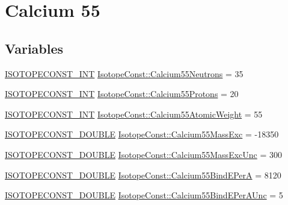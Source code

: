 \hypertarget{group___isotope_const-_calcium-_ca55}{}\section{Calcium 55}
\label{group___isotope_const-_calcium-_ca55}
\subsection*{Variables}
\begin{DoxyCompactItemize}
\item 
\mbox{\hyperlink{group___isotope_const-_macros_ga5f18360b3e99483a35c32d789e62621c}{I\+S\+O\+T\+O\+P\+E\+C\+O\+N\+S\+T\+\_\+\+I\+NT}} \mbox{\hyperlink{group___isotope_const-_calcium-_ca55_ga8b79490a883d8cbecca84e9ad3bafda0}{Isotope\+Const\+::\+Calcium55\+Neutrons}} = 35
\item 
\mbox{\hyperlink{group___isotope_const-_macros_ga5f18360b3e99483a35c32d789e62621c}{I\+S\+O\+T\+O\+P\+E\+C\+O\+N\+S\+T\+\_\+\+I\+NT}} \mbox{\hyperlink{group___isotope_const-_calcium-_ca55_ga8b3fbc5ede4dd4076973e31db9a39f0f}{Isotope\+Const\+::\+Calcium55\+Protons}} = 20
\item 
\mbox{\hyperlink{group___isotope_const-_macros_ga5f18360b3e99483a35c32d789e62621c}{I\+S\+O\+T\+O\+P\+E\+C\+O\+N\+S\+T\+\_\+\+I\+NT}} \mbox{\hyperlink{group___isotope_const-_calcium-_ca55_ga059bea63a9dda70013fb929957ebf18c}{Isotope\+Const\+::\+Calcium55\+Atomic\+Weight}} = 55
\item 
\mbox{\hyperlink{group___isotope_const-_macros_ga8f45a7272ce02c0b4c65c44636ed719a}{I\+S\+O\+T\+O\+P\+E\+C\+O\+N\+S\+T\+\_\+\+D\+O\+U\+B\+LE}} \mbox{\hyperlink{group___isotope_const-_calcium-_ca55_ga9189d8dce03f23dcf125ab6313c675ca}{Isotope\+Const\+::\+Calcium55\+Mass\+Exc}} = -\/18350
\item 
\mbox{\hyperlink{group___isotope_const-_macros_ga8f45a7272ce02c0b4c65c44636ed719a}{I\+S\+O\+T\+O\+P\+E\+C\+O\+N\+S\+T\+\_\+\+D\+O\+U\+B\+LE}} \mbox{\hyperlink{group___isotope_const-_calcium-_ca55_ga00c3b402ab6be6e1a7e6b6cfd55e3218}{Isotope\+Const\+::\+Calcium55\+Mass\+Exc\+Unc}} = 300
\item 
\mbox{\hyperlink{group___isotope_const-_macros_ga8f45a7272ce02c0b4c65c44636ed719a}{I\+S\+O\+T\+O\+P\+E\+C\+O\+N\+S\+T\+\_\+\+D\+O\+U\+B\+LE}} \mbox{\hyperlink{group___isotope_const-_calcium-_ca55_ga25360d88207c049f83528a562c845474}{Isotope\+Const\+::\+Calcium55\+Bind\+E\+PerA}} = 8120
\item 
\mbox{\hyperlink{group___isotope_const-_macros_ga8f45a7272ce02c0b4c65c44636ed719a}{I\+S\+O\+T\+O\+P\+E\+C\+O\+N\+S\+T\+\_\+\+D\+O\+U\+B\+LE}} \mbox{\hyperlink{group___isotope_const-_calcium-_ca55_ga31923acab9b658c16c22126e461cc41c}{Isotope\+Const\+::\+Calcium55\+Bind\+E\+Per\+A\+Unc}} = 5

\end{DoxyCompactItemize}
